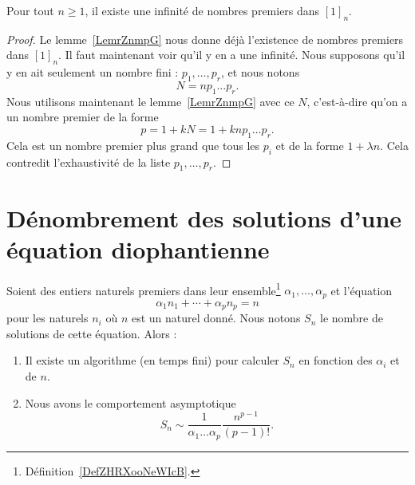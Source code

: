 \begin{theorem}    \label{ThoxwTjcl}
    Pour tout \( n\geq 1\), il existe une infinité de nombres premiers dans \( [1]_n\).
\end{theorem}

\begin{proof}
    Le lemme~\ref{LemrZnmpG} nous donne déjà l'existence de nombres premiers dans \( [1]_n\). Il faut maintenant voir qu'il y en a une infinité. Nous supposons qu'il y en ait seulement un nombre fini : \( p_1,\ldots, p_r\), et nous notons
    \begin{equation}
        N=np_1\ldots p_r.
    \end{equation}
    Nous utilisons maintenant le lemme~\ref{LemrZnmpG} avec ce \( N\), c'est-à-dire qu'on a un nombre premier de la forme
    \begin{equation}
        p=1+kN=1+knp_1\ldots p_r.
    \end{equation}
    Cela est un nombre premier plus grand que tous les \( p_i\) et de la forme \( 1+\lambda n\). Cela contredit l'exhaustivité de la liste \( p_1,\ldots, p_r\).
\end{proof}

\section{Dénombrement des solutions d'une équation diophantienne}

\begin{theorem} \label{ThoDIDNooUrFFei}
    Soient des entiers naturels premiers dans leur ensemble\footnote{Définition~\ref{DefZHRXooNeWIcB}.} \( \alpha_1,\ldots, \alpha_p\) et l'équation
    \begin{equation}
        \alpha_1n_1+\cdots +\alpha_pn_p=n
    \end{equation}
    pour les naturels \( n_i\) où \( n\) est un naturel donné. Nous notons \( S_n\) le nombre de solutions de cette équation. Alors :
    \begin{enumerate}
        \item
            Il existe un algorithme (en temps fini) pour calculer \( S_n\) en fonction des \( \alpha_i\) et de \( n\).
        \item
            Nous avons le comportement asymptotique
            \begin{equation}
                S_n\sim\frac{1}{ \alpha_1\ldots\alpha_p }\frac{ n^{p-1} }{ (p-1)! }.
            \end{equation}
    \end{enumerate}
\end{theorem}

